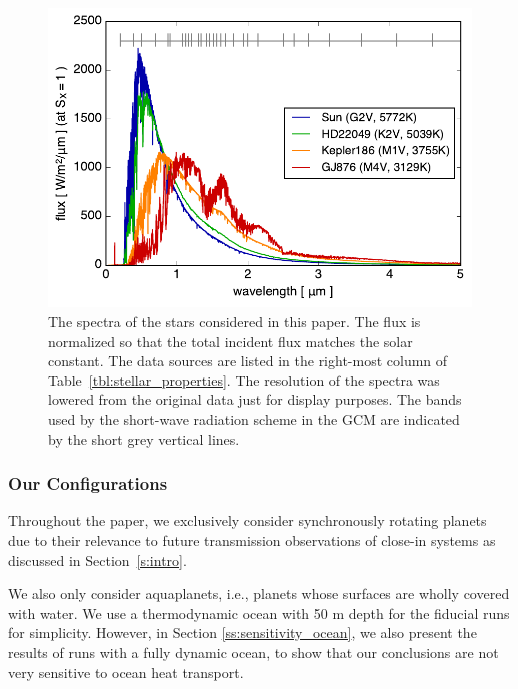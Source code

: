 \documentclass[11pt,numberedappendix,twocolappendix,]{emulateapj}
\begin{document}
\begin{figure}[!b]
    \begin{center}
    \includegraphics[width=\hsize]{star_spectra.pdf}
    \end{center}
\caption{The spectra of the stars considered in this paper. The flux is normalized so that the total incident flux matches the solar constant. The data sources are listed in the right-most column of Table~\ref{tbl:stellar_properties}. The resolution of the spectra was lowered from the original data just for display purposes. The bands used by the short-wave radiation scheme in the GCM are indicated by the short grey vertical lines.}
\label{fig:star_spectra}
\end{figure}

\subsubsection{Our Configurations}

Throughout the paper, we exclusively consider synchronously rotating planets due to their relevance to future transmission observations of close-in systems as discussed in Section~\ref{s:intro}. 

We also only consider aquaplanets, i.e., planets whose surfaces are wholly covered with water. 
We use a thermodynamic ocean with 50 m depth for the fiducial runs for simplicity. 
However, in Section \ref{ss:sensitivity_ocean}, we also present the results of runs with a fully dynamic ocean, to show that our conclusions are not very sensitive to ocean heat transport. 
\end{document}
